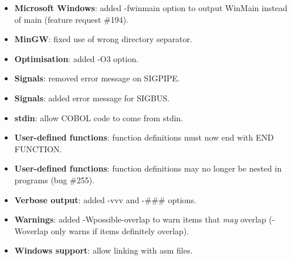 \begin{itemize}
\item \textbf{Microsoft Windows}: added -fwinmain option to output WinMain instead of main (feature request \#194).
\item \textbf{MinGW}: fixed use of wrong directory separator.
\item \textbf{Optimisation}: added -O3 option.
\item \textbf{Signals}: removed error message on SIGPIPE.
\item \textbf{Signals}: added error message for SIGBUS.
\item \textbf{stdin}: allow COBOL code to come from stdin.
\item \textbf{User-defined functions}: function definitions must now end with END FUNCTION.
\item \textbf{User-defined functions}: function definitions may no longer be nested in programs (bug \#255).
\item \textbf{Verbose output}: added -vvv and -\#\#\# options.
\item \textbf{Warnings}: added -Wpossible-overlap to warn items that \emph{may} overlap (-Woverlap only warns if items definitely overlap).
\item \textbf{Windows support}: allow linking with asm files.
\end{itemize}

